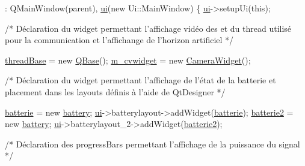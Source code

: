 \begin{DoxyCode}
                                      :
    QMainWindow(parent),
    \hyperlink{classMainWindow_a35466a70ed47252a0191168126a352a5}{ui}(\textcolor{keyword}{new} Ui::MainWindow)
\{
    \hyperlink{classMainWindow_a35466a70ed47252a0191168126a352a5}{ui}->setupUi(\textcolor{keyword}{this});

    \textcolor{comment}{/* Déclaration du widget permettant l'affichage vidéo des et du thread
       utilisé pour la communication et l'affichange de l'horizon artificiel */}

    \hyperlink{classMainWindow_aa35075e5c401c08057511b93444701cf}{threadBase} = \textcolor{keyword}{new} \hyperlink{classQBase}{QBase}();
    \hyperlink{classMainWindow_a3225ace47a46792151d14646b6429712}{m\_cvwidget} = \textcolor{keyword}{new} \hyperlink{classCameraWidget}{CameraWidget}();

    \textcolor{comment}{/* Déclaration du widget permettant l'affichage de l'état de la batterie et
       placement dans les layouts définis à l'aide de QtDesigner */}

    \hyperlink{classMainWindow_af02a0259f044a5b2a1feabffccbc227e}{batterie} = \textcolor{keyword}{new} \hyperlink{classbattery}{battery};
    \hyperlink{classMainWindow_a35466a70ed47252a0191168126a352a5}{ui}->batterylayout->addWidget(\hyperlink{classMainWindow_af02a0259f044a5b2a1feabffccbc227e}{batterie});
    \hyperlink{classMainWindow_a2c5aa6244af6d3e2018b98f285b0b84a}{batterie2} = \textcolor{keyword}{new} \hyperlink{classbattery}{battery};
    \hyperlink{classMainWindow_a35466a70ed47252a0191168126a352a5}{ui}->batterylayout\_2->addWidget(\hyperlink{classMainWindow_a2c5aa6244af6d3e2018b98f285b0b84a}{batterie2});

    \textcolor{comment}{/* Déclaration des progressBars permettant l'affichage de la puissance du
       signal */}


\end{DoxyCode}
